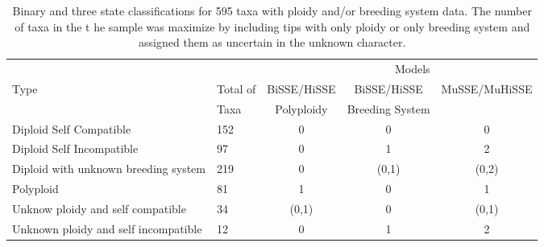 \begin{table}
\begin{tabular}{@{}llccc@{}} \toprule
\multicolumn{4}{r}{Models} \\ \cmidrule(r){3-5}
Type & Total of & BiSSE/HiSSE & BiSSE/HiSSE & MuSSE/MuHiSSE\\ 
 &Taxa &  Polyploidy & Breeding System &  \\ \midrule
Diploid Self Compatible & 152 & 0 &  0 & 0 \\
Diploid Self Incompatible& 97 & 0  & 1 & 2\\
Diploid with unknown breeding system & 219 & 0 & (0,1) & (0,2) \\
Polyploid & 81 & 1& 0 & 1 \\
Unknow ploidy and self compatible& 34 & (0,1)& 0 & (0,1) \\ 
Unknown ploidy and self incompatible & 12 & 0 & 1 & 2 \\ \bottomrule
\end{tabular}
\caption{Binary and three state classifications for 595 taxa with ploidy and/or breeding system data. The number of taxa in the t he sample was maximize by including tips with only ploidy or only breeding system and assigned them as uncertain in the unknown character.}
\label{table:stateclassifications}
\end{table}

